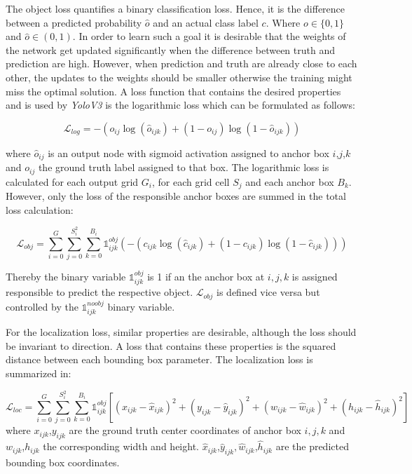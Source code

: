 The object loss quantifies a binary classification loss. Hence, it is the difference between a predicted probability $\hat o$ and an actual class label $c$. Where $o \in \{0,1\}$ and $\hat o \in (0,1)$. In order to learn such a goal it is desirable that the weights of the network get updated significantly when the difference between truth and prediction are high. However, when prediction and truth are already close to each other, the updates to the weights should be smaller otherwise the training might miss the optimal solution. A loss function that contains the desired properties and is used by \textit{YoloV3} is the logarithmic loss which can be formulated as follows:

\begin{equation}
\mathcal{L}_{log} = -(o_{ij}\log(\hat o_{ijk}) + (1 - o_{ij})\log(1 - \hat o_{ijk}))
\end{equation}

where $\hat o_{ij}$ is an output node with sigmoid activation assigned to anchor box $i$,$j$,$k$ and $ o_{ij}$ the ground truth label assigned to that box. The logarithmic loss is calculated for each output grid $G_i$, for each grid cell $S_j$ and each anchor box $B_k$. However, only the loss of the responsible anchor boxes are summed in the total loss calculation:

\begin{equation}
\mathcal{L}_{obj} = \sum_{i=0}^{G}\sum_{j=0}^{S_i^2}\sum_{k=0}^{B_i} \mathbb{1}_{ijk}^{obj}(-(c_{ijk}\log(\hat c_{ijk}) + (1 - c_{ijk})\log(1 - \hat c_{ijk})))
\end{equation}

Thereby the  binary variable $\mathbb{1}_{ijk}^{obj}$ is 1 if an the anchor box at $i,j,k$ is assigned responsible to predict the respective object. $\mathcal{L}_{obj}$ is defined vice versa but controlled by the $\mathbb{1}_{ijk}^{noobj}$ binary variable.

For the localization loss, similar properties are desirable, although the loss should be invariant to direction. A loss that contains these properties is the squared distance between each bounding box parameter. The localization loss is summarized in:

\begin{equation}
\mathcal{L}_{loc} = \sum_{i=0}^{G} \sum_{j=0}^{S_i^2}\sum_{k=0}^{B_i} \mathbb{1}_{ijk}^{obj}[(x_{ijk}-\hat{x}_{ijk})^2 + (y_{ijk}-\hat{y}_{ijk})^2  + (w_{ijk}-\hat{w}_{ijk})^2 +(h_{ijk}-\hat{h}_{ijk})^2 ]
\end{equation}
where $x_{ijk}$,$y_{ijk}$ are the ground truth center coordinates of anchor box $i,j,k$ and $w_{ijk}$,$h_{ijk}$ the corresponding width and height. $\hat x_{ijk}$,$\hat y_{ijk}, \hat w_{ijk}$,$\hat h_{ijk}$ are the predicted bounding box coordinates. 

